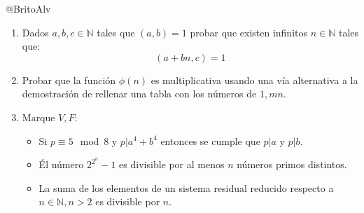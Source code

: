 \documentclass[14pt]{extarticle}
\begin{document}
@BritoAlv



\begin{tcolorbox}[colback=blue!5!white,colframe=blue!75!black, title = Preguntas]

\begin{enumerate}
    \item Dados $a,b,c \in  \mathbb{N}$ tales que $(a,b) = 1$ probar que existen infinitos $n \in \mathbb{N}$ tales que:
    $$(a+bn, c) = 1$$

    \item Probar que la función $\phi(n)$ es multiplicativa usando una vía alternativa a la demostración de rellenar una tabla con los números de $1, mn$.

    \item Marque $V,F$:
    \begin{itemize}
        \item Si $p \equiv 5 \mod{8} $ y $p | a^4+b^4$ entonces se cumple que $p | a$ y $p | b$.
        
        \item Él número $2^{2^n}-1$ es divisible por al menos $n$ números primos distintos.
    
        \item La suma de los elementos de un sistema residual reducido respecto a $n \in \mathbb{N}, n > 2$ es divisible por $n$.  
    \end{itemize}
\end{enumerate}   

\end{tcolorbox}

\newpage
\end{document}
